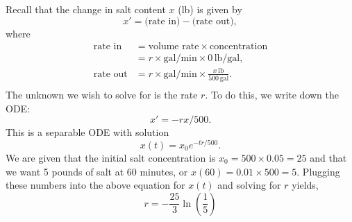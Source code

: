 \documentclass[11pt,a4paper]{article}
\begin{document}
\setlength{\parindent}{0pt}
Recall that the change in salt content $x$ (\si{lb}) is given by
\begin{equation*}
    x' = \text{(rate in)} - \text{(rate out)},
\end{equation*}
where
\begin{align*}
    \text{rate in} &= \text{volume rate} \times \text{concentration}\\
    &= r \times \text{gal/min} \times 0\,\text{lb/gal},\\
    \text{rate out} &=  r \times \text{gal/min} \times \frac{x\,\text{lb}}{500\,\text{gal}}.\\
\end{align*}
The unknown we wish to solve for is the rate $r$. To do this, we write down the ODE:
\begin{equation*}
    x' = -r x/500.
\end{equation*}
This is a separable ODE with solution
\begin{equation*}
    x(t) = x_0 e^{-tr/500}.
\end{equation*}
We are given that the initial salt concentration is $x_0 = 500\times 0.05 = 25$ and that we want 5 pounds of salt at 60 minutes, or $x(60) = 0.01\times500 = 5$. Plugging these numbers into the above equation for $x(t)$ and solving for $r$ yields,
\begin{equation*}
    r = -\frac{25}{3}\ln\left(\frac{1}{5}\right)
\end{equation*}
\end{document}
